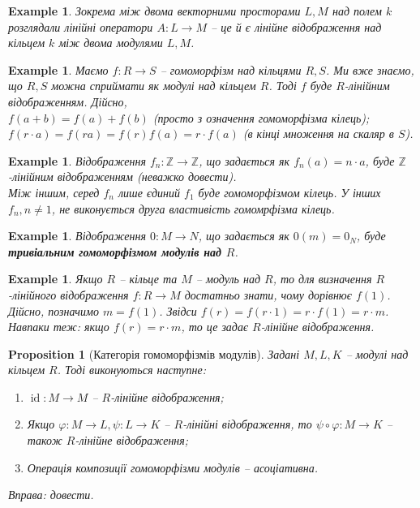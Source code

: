 \documentclass[a4paper, 10pt]{article}
\theoremstyle{theoremdd}
\theoremstyle{theoremdd}
\theoremstyle{theoremdd}
\theoremstyle{theoremdd}
\theoremstyle{theoremdd}
\newtheorem{example}[theorem]{Example}
\theoremstyle{theoremdd}
\theoremstyle{theoremdd}
\theoremstyle{theoremdd}
\theoremstyle{theoremdd}
\newtheorem{proposition}[theorem]{Proposition}
\theoremstyle{theoremdd}
\theoremstyle{theoremdd}
\theoremstyle{theoremdd}
\theoremstyle{theoremdd}
\theoremstyle{theoremdd}
\theoremstyle{theoremdd}
\DeclareMathOperator{\id}{id}
\begin{document}
\begin{example}
Зокрема між двома векторними просторами $L,M$ над полем $k$ розглядали лінійні оператори $A \colon L \to M$ -- це й є лінійне відображення над кільцем $k$ між двома модулями $L,M$.
\end{example}

\begin{example}
Маємо $f \colon R \to S$ -- гомоморфізм над кільцями $R,S$. Ми вже знаємо, що $R,S$ можна сприймати як модулі над кільцем $R$. Тоді $f$ буде $R$-лінійним відображенням. Дійсно,\\
$f(a+b) = f(a) + f(b)$ (просто з означення гомоморфізма кілець);\\
$f(r \cdot a) = f(ra) = f(r)f(a) = r \cdot f(a)$ (в кінці множення на скаляр в $S$).
\end{example}

\begin{example}
Відображення $f_n \colon \mathbb{Z} \to \mathbb{Z}$, що задається як $f_n(a) = n \cdot a$, буде $\mathbb{Z}$-лінійним відображенням (неважко довести).\\
Між іншим, серед $f_n$ лише єдиний $f_1$ буде гомоморфізмом кілець. У інших $f_n, n \neq 1$, не виконується друга властивість гомомрфізма кілець.
\end{example}

\begin{example}
Відображення $0 \colon M \to N$, що задається як $0(m) = 0_N$, буде \textbf{тривіальним гомоморфізмом модулів над $R$}.
\end{example}

\begin{example}
Якщо $R$ -- кільце та $M$ -- модуль над $R$, то для визначення $R$-лінійного відображення $f \colon R \to M$ достатньо знати, чому дорівнює $f(1)$. Дійсно, позначимо $m = f(1)$. Звідси $f(r) = f(r \cdot 1) = r \cdot f(1) = r \cdot m$.
\bigskip \\
Навпаки теж: якщо $f(r) = r \cdot m$, то це задає $R$-лінійне відображення.
\end{example}

\begin{proposition}[Категорія гомоморфізмів модулів]
Задані $M,L,K$ -- модулі над кільцем $R$. Тоді виконуються наступне:
\begin{enumerate}[nosep,wide=0pt,label={\arabic*)}]
\item $\id \colon M \to M$ -- $R$-лінійне відображення;
\item Якщо $\varphi \colon M \to L, \psi \colon L \to K$ -- $R$-лінійні відображення, то $\psi \circ \varphi \colon M \to K$ -- також $R$-лінійне відображення;
\item Операція композиції гомоморфізми модулів -- асоціативна.
\end{enumerate}
\textit{Вправа: довести.}
\end{proposition}
\end{document}
